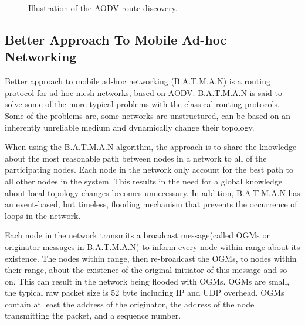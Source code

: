 \begin{figure}[!h]
	\centering
	\caption{Illustration of the AODV route discovery.}
	\label{fig:AODVfigure}
\end{figure}

\subsection{Better Approach To Mobile Ad-hoc Networking}
Better approach to mobile ad-hoc networking (B.A.T.M.A.N) is a routing protocol for ad-hoc mesh networks, based on AODV. 
B.A.T.M.A.N is said to solve some of the more typical problems with the classical routing protocols.
Some of the problems are, some networks are unstructured, can be based on an inherently unreliable medium and dynamically change their topology\cite{BATMAN}.

When using the B.A.T.M.A.N algorithm, the approach is to share the knowledge about the most reasonable path between nodes in a network to all of the participating nodes.
Each node in the network only account for the best path to all other nodes in the system.
This results in the need for a global knowledge about local topology changes becomes unnecessary.
In addition, B.A.T.M.A.N has an event-based, but timeless, flooding mechanism that prevents the occurrence of loops in the network.

Each node in the network transmits a broadcast message(called OGMs or originator messages in B.A.T.M.A.N) to inform every node within range about its existence.
The nodes within range, then re-broadcast the OGMs, to nodes within their range, about the existence of the original initiator of this message and so on.
This can result in the network being flooded with OGMs.
OGMs are small, the typical raw packet size is 52 byte including IP and UDP overhead\cite{BATMAN}.
OGMs contain at least the address of the originator, the address of the node transmitting the packet, and a sequence number.

